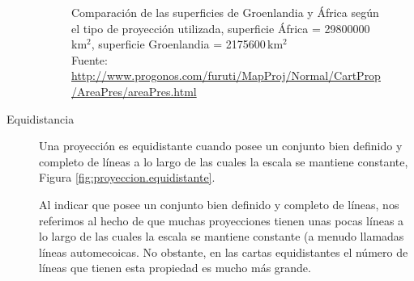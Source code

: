 \begin{description}
\begin{figure}[!h]
  \centering
  \caption{Comparaci\'on de las superficies de Groenlandia y \'Africa seg\'un el tipo de proyecci\'on utilizada, superficie \'Africa = 29800000\,km$^2$, superficie Groenlandia = 2175600\,km$^2$\\{\footnotesize Fuente: \url{http://www.progonos.com/furuti/MapProj/Normal/CartProp/AreaPres/areaPres.html}}
}
  \label{fig:groenlandia.africa.comparacion.superficies.segun.tipo.proyeccion}
\end{figure}


\item[Equidistancia] Una proyección es equidistante cuando posee un conjunto bien definido y completo de líneas a lo largo de las cuales la escala se mantiene constante, Figura \ref{fig:proyeccion.equidistante}.

Al indicar que posee un conjunto bien definido y completo de líneas, nos referimos al hecho de que muchas proyecciones tienen unas pocas líneas a lo largo de las cuales la escala se mantiene constante (a menudo llamadas líneas automecoicas. No obstante, en las cartas equidistantes el número de líneas que tienen esta propiedad es mucho más grande.


\end{description}
